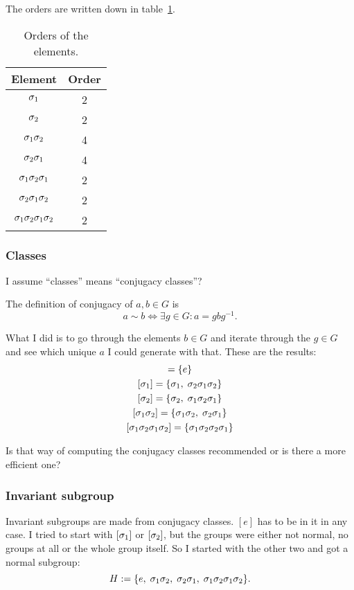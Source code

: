 \documentclass[11pt, english, fleqn, DIV=15, headinclude, BCOR=1cm]{scrartcl}
\newcommand\inv{^{-1}}
\begin{document}
The orders are written down in table~\ref{tab:orders}.

\begin{table}[htbp]
    \centering
    \begin{tabular}{cc}
        Element & Order \\
        \midrule
        $\sigma_1$ & 2 \\
        $\sigma_2$ & 2 \\
        $\sigma_1\sigma_2$ & 4 \\
        $\sigma_2\sigma_1$ & 4 \\
        $\sigma_1\sigma_2\sigma_1$ & 2 \\
        $\sigma_2\sigma_1\sigma_2$ & 2 \\
        $\sigma_1\sigma_2\sigma_1\sigma_2$ & 2
    \end{tabular}
    \caption{%
        Orders of the elements.
    }
    \label{tab:orders}
\end{table}

\subsubsection{Classes}

I assume “classes” means “conjugacy classes”?

The definition of conjugacy of $a, b \in G$ is
\[
    a \sim b
    \iff
    \exists g \in G \colon
    a = g b g\inv.
\]

What I did is to go through the elements $b \in G$ and iterate through the $g
\in G$ and see which unique $a$ I could generate with that. These are the
results:
\begin{gather*}
    [e] = \{ e \} \\
    [\1] = \{ \1 \ssep \2\1\2 \} \\
    [\2] = \{ \2 \ssep \1\2\1 \} \\
    [\1\2] = \{ \1\2 \ssep \2\1 \} \\
    [\1\2\1\2] = \{ \1\2\2\1 \}
\end{gather*}

\begin{question}
    Is that way of computing the conjugacy classes recommended or is there a
    more efficient one?
\end{question}

\subsubsection{Invariant subgroup}

Invariant subgroups are made from conjugacy classes. $[e]$ has to be in it in
any case. I tried to start with $[\sigma_1]$ or $[\sigma_2]$, but the groups were either
not normal, no groups at all or the whole group itself. So I started with the
other two and got a normal subgroup:
\[
    H := \{ e ,\; \sigma_1\sigma_2 ,\; \sigma_2\sigma_1 ,\; \sigma_1\sigma_2\sigma_1\sigma_2 \}.
\]
\end{document}

